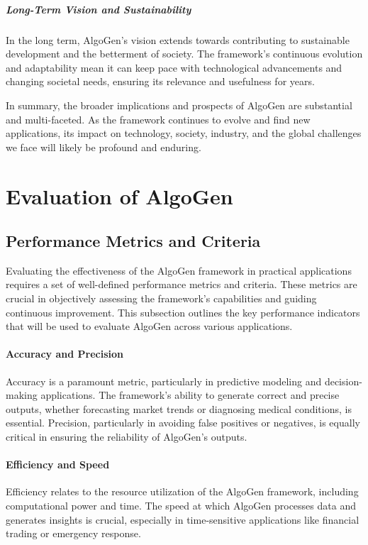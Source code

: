 \documentclass{article}
\begin{document}
\subparagraph{Long-Term Vision and Sustainability}
In the long term, AlgoGen’s vision extends towards contributing to sustainable development and the betterment of society. The framework's continuous evolution and adaptability mean it can keep pace with technological advancements and changing societal needs, ensuring its relevance and usefulness for years.

In summary, the broader implications and prospects of AlgoGen are substantial and multi-faceted. As the framework continues to evolve and find new applications, its impact on technology, society, industry, and the global challenges we face will likely be profound and enduring.



\section{Evaluation of AlgoGen}

\subsection{Performance Metrics and Criteria}
Evaluating the effectiveness of the AlgoGen framework in practical applications requires a set of well-defined performance metrics and criteria. These metrics are crucial in objectively assessing the framework's capabilities and guiding continuous improvement. This subsection outlines the key performance indicators that will be used to evaluate AlgoGen across various applications.

\paragraph{Accuracy and Precision}
Accuracy is a paramount metric, particularly in predictive modeling and decision-making applications. The framework's ability to generate correct and precise outputs, whether forecasting market trends or diagnosing medical conditions, is essential. Precision, particularly in avoiding false positives or negatives, is equally critical in ensuring the reliability of AlgoGen's outputs.

\paragraph{Efficiency and Speed}
Efficiency relates to the resource utilization of the AlgoGen framework, including computational power and time. The speed at which AlgoGen processes data and generates insights is crucial, especially in time-sensitive applications like financial trading or emergency response.
\end{document}
